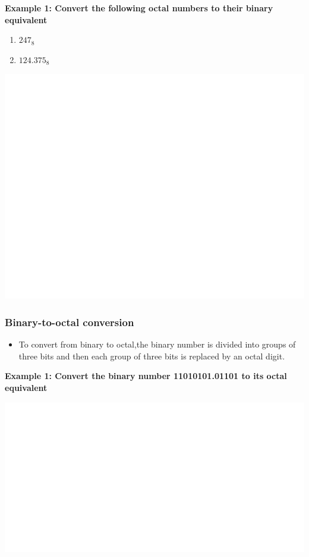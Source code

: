 \documentclass[]{book}
\providecommand{\tightlist}{%
  \setlength{\itemsep}{0pt}\setlength{\parskip}{0pt}}
\begin{document}
\textbf{Example 1: Convert the following octal numbers to their binary equivalent}

\begin{enumerate}
\def\labelenumi{(\alph{enumi})}
\tightlist
\item
  \(247_8\)
\item
  \(124.375_8\)
\end{enumerate}

\begin{center}\includegraphics[width=1\linewidth]{figure/NSbox131-1} \end{center}

\hypertarget{binary-to-octal-conversion}{%
\subsubsection{Binary-to-octal conversion}\label{binary-to-octal-conversion}}

\begin{itemize}
\tightlist
\item
  To convert from binary to octal,the binary number is divided into groups of three bits and then each group of three bits is replaced by an octal digit.
\end{itemize}

\textbf{Example 1: Convert the binary number 11010101.01101 to its octal equivalent}

\begin{center}\includegraphics[width=1\linewidth]{figure/NSbox13-1} \end{center}
\end{document}
